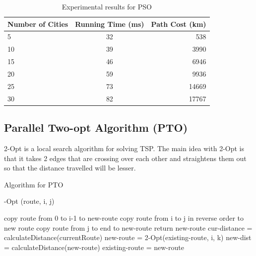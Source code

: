 \documentclass[conference]{IEEEtran}
\begin{document}
\begin{table}[h!]
  \begin{center}
    \label{tab:table2} \caption{Experimental results for PSO}
    \begin{tabular}{l|c|r}
      \textbf{Number of Cities} & \textbf{Running Time (ms)} & \textbf{Path Cost (km)}\\
      \hline
      5 & 32 & 538\\
      10 & 39 & 3990\\
      15 & 46 & 6946\\
      20 & 59 & 9936\\ 
      25 & 73 & 14669\\
      30 & 82 & 17767\\
    \end{tabular}
  \end{center}
\end{table}




\subsection {Parallel Two-opt Algorithm (PTO)}
2-Opt is a local search algorithm for solving TSP. The main idea with 2-Opt is that it takes 2 edges that are crossing over each other and straightens them out so that the distance travelled will be lesser.



\newlength\myindent
\setlength\myindent{2em}
\newcommand\bindent{%
  \begingroup
  \setlength{\itemindent}{\myindent}
  \addtolength{\algorithmicindent}{\myindent}
}
\newcommand\eindent{\endgroup}
\begin{algorithm}[H]
\caption{Algorithm for PTO}
\begin{algorithmic}[1]
-Opt (route, i, j)
\bindent
\STATE copy route from 0 to i-1 to new-route
\STATE copy route from i to j in reverse order to new route
\STATE copy route from j to end to new-route
\STATE return new-route
\eindent
\REPEAT
\STATE cur-distance = calculateDistance(currentRoute)
\STATE new-route = 2-Opt(existing-route, i, k)
\STATE new-dist = calculateDistance(new-route)
\STATE existing-route = new-route
\ENDIF
\ENDFOR
\ENDFOR 
{}
\end{algorithmic}
\end{algorithm} 
\end{document}
